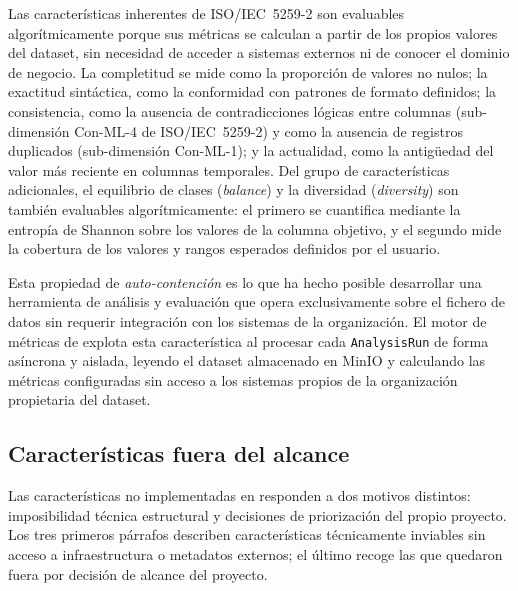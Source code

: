 Las características inherentes de \ac{ISO}/\ac{IEC}~5259-2 son evaluables
algorítmicamente porque sus métricas se calculan a partir de los propios
valores del dataset, sin necesidad de acceder a sistemas externos ni de
conocer el dominio de negocio.  La completitud se mide como la proporción
de valores no nulos; la exactitud sintáctica, como la conformidad con
patrones de formato definidos; la consistencia, como la ausencia de
contradicciones lógicas entre columnas (sub-dimensión Con-ML-4 de
\ac{ISO}/\ac{IEC}~5259-2) y como la ausencia de registros duplicados
(sub-dimensión Con-ML-1); y la actualidad, como la antigüedad del valor
más reciente en columnas temporales.  Del grupo de características
adicionales, el equilibrio de clases (\emph{balance}) y la diversidad
(\emph{diversity}) son también evaluables algorítmicamente: el primero se
cuantifica mediante la entropía de Shannon sobre los valores de la columna
objetivo, y el segundo mide la cobertura de los valores y rangos esperados
definidos por el usuario.

Esta propiedad de \emph{auto-contención} es lo que ha hecho posible
desarrollar una herramienta de análisis y evaluación que opera
exclusivamente sobre el fichero de datos sin requerir integración con los
sistemas de la organización.  El motor de métricas de \dataqual explota
esta característica al procesar cada \texttt{AnalysisRun} de forma
asíncrona y aislada, leyendo el dataset almacenado en MinIO y calculando
las métricas configuradas sin acceso a los sistemas propios de la
organización propietaria del dataset.

\subsection{Características fuera del alcance}
\label{sec:caracteristicas-fuera-alcance}

Las características no implementadas en \dataqual responden a dos motivos
distintos: imposibilidad técnica estructural y decisiones de priorización
del propio proyecto.  Los tres primeros párrafos describen características
técnicamente inviables sin acceso a infraestructura o metadatos externos;
el último recoge las que quedaron fuera por decisión de alcance del
proyecto.


